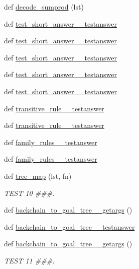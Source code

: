 \begin{DoxyCompactItemize}
def \hyperlink{namespacetests_a6b52c19c915c31788b6aca6d2e5d1bd6}{decode\+\_\+sumprod} (lst)
\item 
def \hyperlink{namespacetests_ae144e2a3f724bc73219a0e84db23e50e}{test\+\_\+short\+\_\+answer\+\_\+\_\+testanswer}
\item 
def \hyperlink{namespacetests_a5fb2cfb5236c944ad3b2a925a9ecd65e}{test\+\_\+short\+\_\+answer\+\_\+\_\+testanswer}
\item 
def \hyperlink{namespacetests_ac4e0552a848f3beb8eed67a43cd88c49}{test\+\_\+short\+\_\+answer\+\_\+\_\+testanswer}
\item 
def \hyperlink{namespacetests_a0828de631c0d74ff699ee564c09c968f}{test\+\_\+short\+\_\+answer\+\_\+\_\+testanswer}
\item 
def \hyperlink{namespacetests_a0e33e33b82503c0b9863060bace16423}{test\+\_\+short\+\_\+answer\+\_\+\_\+testanswer}
\item 
def \hyperlink{namespacetests_a80985cb6c9a43a479e7e8f38723b9a31}{transitive\+\_\+rule\+\_\+\_\+testanswer}
\item 
def \hyperlink{namespacetests_a86d75ea81d5ce9e2787b8bf82601cd1f}{transitive\+\_\+rule\+\_\+\_\+testanswer}
\item 
def \hyperlink{namespacetests_ab7f135cb0f82085f38aafe90178a7674}{family\+\_\+rules\+\_\+\_\+testanswer}
\item 
def \hyperlink{namespacetests_a2b2de6d11b3c3e03c261a1358d6b90dc}{family\+\_\+rules\+\_\+\_\+testanswer}
\item 
def \hyperlink{namespacetests_a9c0482fc255ef94e8ce94e4f6420a34a}{tree\+\_\+map} (lst, fn)
\begin{DoxyCompactList}\small\item\em T\+E\+S\+T 10 \#\#\#. \end{DoxyCompactList}\item 
def \hyperlink{namespacetests_a17fd826c85fbaf3644b53c324910d313}{backchain\+\_\+to\+\_\+goal\+\_\+tree\+\_\+\_\+getargs} ()
\item 
def \hyperlink{namespacetests_a7791e71e53368f7613ca4df20e1ea0bb}{backchain\+\_\+to\+\_\+goal\+\_\+tree\+\_\+\_\+testanswer}
\item 
def \hyperlink{namespacetests_a7d9eaa78bd96ccc722f2060048723b6f}{backchain\+\_\+to\+\_\+goal\+\_\+tree\+\_\+\_\+getargs} ()
\begin{DoxyCompactList}\small\item\em T\+E\+S\+T 11 \#\#\#. \end{DoxyCompactList}\item 

\end{DoxyCompactItemize}
